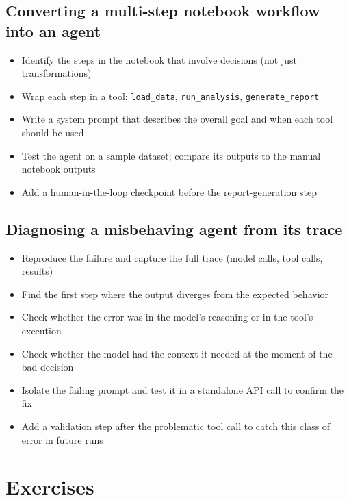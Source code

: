\subsection{Converting a multi-step notebook workflow into an agent}
\begin{itemize}[noitemsep,topsep=0pt]
  \item Identify the steps in the notebook that involve decisions (not just transformations)
  \item Wrap each step in a tool: \texttt{load\_data}, \texttt{run\_analysis}, \texttt{generate\_report}
  \item Write a system prompt that describes the overall goal and when each tool should be used
  \item Test the agent on a sample dataset; compare its outputs to the manual notebook outputs
  \item Add a human-in-the-loop checkpoint before the report-generation step
\end{itemize}

\subsection{Diagnosing a misbehaving agent from its trace}
\begin{itemize}[noitemsep,topsep=0pt]
  \item Reproduce the failure and capture the full trace (model calls, tool calls, results)
  \item Find the first step where the output diverges from the expected behavior
  \item Check whether the error was in the model's reasoning or in the tool's execution
  \item Check whether the model had the context it needed at the moment of the bad decision
  \item Isolate the failing prompt and test it in a standalone API call to confirm the fix
  \item Add a validation step after the problematic tool call to catch this class of error in future runs
\end{itemize}

\section{Exercises}

